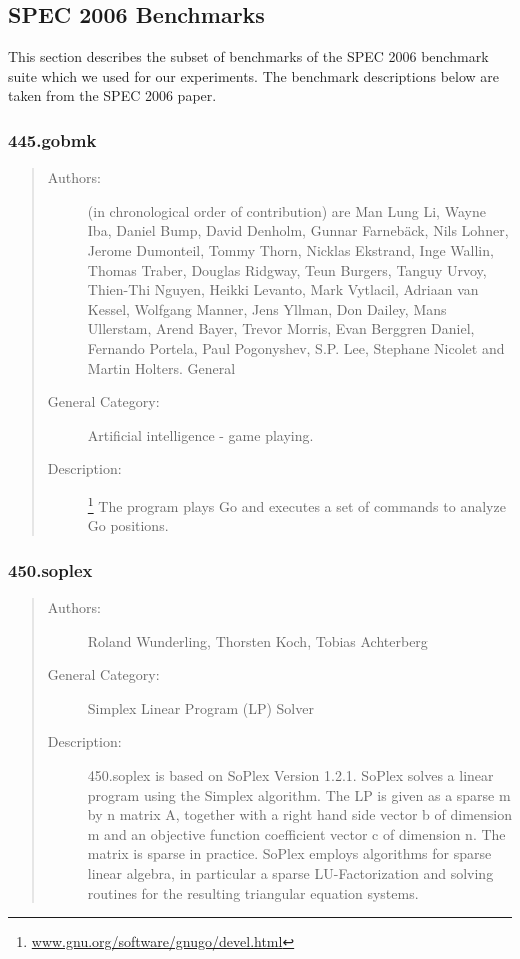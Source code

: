 \documentclass[onecolumn, openright, master, english, signatures]{dbrgrptt}
\begin{document}
\subsection{SPEC 2006 Benchmarks}

This section describes the subset of benchmarks of the SPEC 2006 benchmark suite \cite{henning2006spec} which we used for our experiments. The benchmark descriptions below are taken from the SPEC 2006 paper.

\subsubsection{445.gobmk}

\begin{quote}
\begin{description}
\item[Authors:] (in chronological order of contribution) are Man Lung Li, Wayne Iba, Daniel Bump, David Denholm, Gunnar Farneb\"ack, Nils Lohner, Jerome Dumonteil, Tommy Thorn, Nicklas Ekstrand, Inge Wallin, Thomas Traber, Douglas Ridgway, Teun Burgers, Tanguy Urvoy, Thien-Thi Nguyen, Heikki Levanto, Mark Vytlacil, Adriaan van Kessel, Wolfgang Manner, Jens Yllman, Don Dailey, Mans Ullerstam, Arend Bayer, Trevor Morris, Evan Berggren Daniel, Fernando Portela, Paul Pogonyshev, S.P. Lee, Stephane Nicolet and Martin Holters. General

\item[General Category:] Artificial intelligence - game playing.

\item[Description:]\footnote{\url{www.gnu.org/software/gnugo/devel.html}} The program plays Go and executes a set of commands to analyze Go positions.
\end{description}
\end{quote}

\subsubsection{450.soplex}

\begin{quote}
\begin{description}
\item[Authors:] Roland Wunderling, Thorsten Koch, Tobias Achterberg

\item[General Category:] Simplex Linear Program (LP) Solver

\item[Description:] 450.soplex is based on SoPlex Version 1.2.1. SoPlex solves a linear program using the Simplex algorithm. The LP is given as a sparse m by n matrix A, together with a right hand side vector b of dimension m and an objective function coefficient vector c of dimension n. The matrix is sparse in practice. SoPlex employs algorithms for sparse linear algebra, in particular a sparse LU-Factorization and solving routines for the resulting triangular equation systems.
\end{description}
\end{quote}
\end{document}
